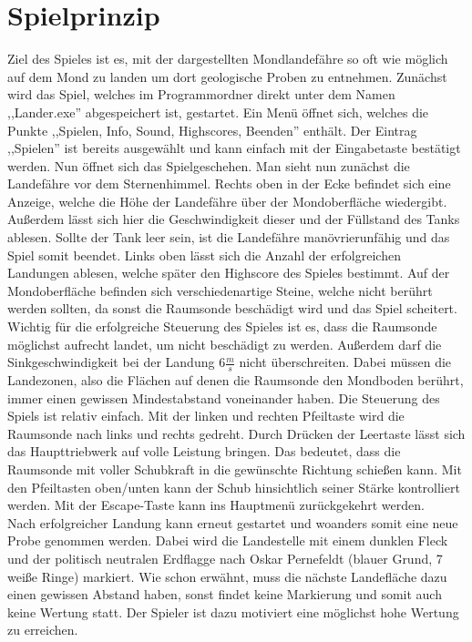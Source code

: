 \documentclass[hidelinks]{article}
\begin{document}
\section{Spielprinzip}
Ziel des Spieles ist es, mit der dargestellten Mondlandefähre so oft wie möglich auf dem Mond zu landen um dort geologische Proben zu entnehmen. Zunächst wird das Spiel, welches im Programmordner direkt unter dem Namen ,,Lander.exe'' abgespeichert ist, gestartet. Ein Menü öffnet sich, welches die Punkte ,,Spielen, Info, Sound, Highscores, Beenden'' enthält. Der Eintrag ,,Spielen'' ist bereits ausgewählt und kann einfach mit der Eingabetaste bestätigt werden. Nun öffnet sich das Spielgeschehen. Man sieht nun zunächst die Landefähre vor dem Sternenhimmel. Rechts oben in der Ecke befindet sich eine Anzeige, welche die Höhe der Landefähre über der Mondoberfläche wiedergibt. Außerdem lässt sich hier die Geschwindigkeit dieser und der Füllstand des Tanks ablesen. Sollte der Tank leer sein, ist die Landefähre manövrierunfähig und das Spiel somit beendet. Links oben lässt sich die Anzahl der erfolgreichen Landungen ablesen, welche später den Highscore des Spieles bestimmt. Auf der Mondoberfläche befinden sich verschiedenartige Steine, welche nicht berührt werden sollten, da sonst die Raumsonde beschädigt wird und das Spiel scheitert.\\
Wichtig für die erfolgreiche Steuerung des Spieles ist es, dass die Raumsonde möglichst aufrecht landet, um nicht beschädigt zu werden. Außerdem darf die Sinkgeschwindigkeit bei der Landung $6\frac{m}{s}$ nicht überschreiten. Dabei müssen die Landezonen, also die Flächen auf denen die Raumsonde den Mondboden berührt, immer einen gewissen Mindestabstand voneinander haben.
Die Steuerung des Spiels ist relativ einfach. Mit der linken und rechten Pfeiltaste wird die Raumsonde nach links und rechts gedreht. Durch Drücken der Leertaste lässt sich das Haupttriebwerk auf volle Leistung bringen. Das bedeutet, dass die Raumsonde mit voller Schubkraft in die gewünschte Richtung schießen kann. Mit den Pfeiltasten oben/unten kann der Schub hinsichtlich seiner Stärke kontrolliert werden. Mit der Escape-Taste kann ins Hauptmenü zurückgekehrt werden.\\
Nach erfolgreicher Landung kann erneut gestartet und woanders somit eine neue Probe genommen werden. Dabei wird die Landestelle mit einem dunklen Fleck und der politisch neutralen Erdflagge nach Oskar Pernefeldt (blauer Grund, 7 weiße Ringe)\cite{Erdflagge} markiert. Wie schon erwähnt, muss die nächste Landefläche dazu einen gewissen Abstand haben, sonst findet keine Markierung und somit auch keine Wertung statt. Der Spieler ist dazu motiviert eine möglichst hohe Wertung zu erreichen.\\
\end{document}
